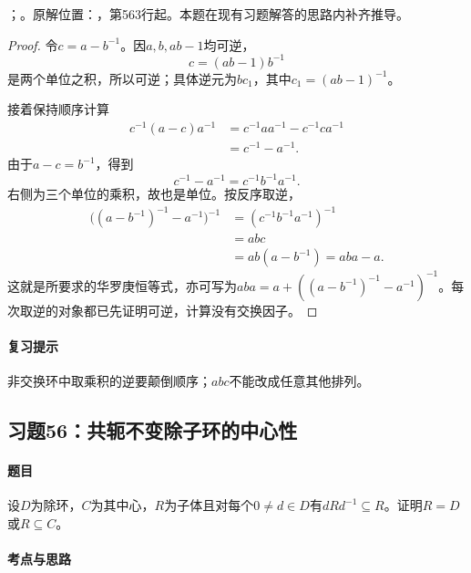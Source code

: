 ；。原解位置：，第563行起。本题在现有习题解答的思路内补齐推导。


\begin{proof}

令$c=a-b^{-1}$。因$a,b,ab-1$均可逆，
\[
c=(ab-1)b^{-1}
\]
是两个单位之积，所以可逆；具体逆元为$bc_1$，其中$c_1=(ab-1)^{-1}$。

接着保持顺序计算
\begin{align*}
c^{-1}(a-c)a^{-1}
&=c^{-1}aa^{-1}-c^{-1}ca^{-1}\\
&=c^{-1}-a^{-1}.
\end{align*}
由于$a-c=b^{-1}$，得到
\[
c^{-1}-a^{-1}=c^{-1}b^{-1}a^{-1}.
\]
右侧为三个单位的乘积，故也是单位。按反序取逆，
\begin{align*}
\bigl((a-b^{-1})^{-1}-a^{-1}\bigr)^{-1}
&=(c^{-1}b^{-1}a^{-1})^{-1}\\
&=abc\\
&=ab(a-b^{-1})=aba-a.
\end{align*}
这就是所要求的华罗庚恒等式，亦可写为$aba=a+((a-b^{-1})^{-1}-a^{-1})^{-1}$。每次取逆的对象都已先证明可逆，计算没有交换因子。

\end{proof}

\paragraph{复习提示}

非交换环中取乘积的逆要颠倒顺序；$abc$不能改成任意其他排列。



\subsection{习题56：共轭不变除子环的中心性}

\label{ex:3:56}

\paragraph{题目}

设$D$为除环，$C$为其中心，$R$为子体且对每个$0\ne d\in D$有$dRd^{-1}\subseteq R$。证明$R=D$或$R\subseteq C$。

\paragraph{考点与思路}

